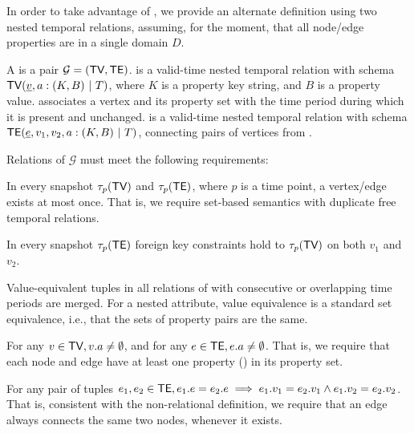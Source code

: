In order to take advantage of \tra, we provide an alternate definition
using two nested temporal relations, assuming, for the
  moment, that all node/edge properties are in a single domain $D$.

\begin{definition}
\label{def:tg2}
A \tg is a pair $\mathcal{G}=(\textsf{TV}, \textsf{TE})$. \tv is a valid-time nested
temporal relation with schema $\textsf{TV}(\underline{v}, a: (K,B) ~|~T)$,
where $K$ is a property key string, and $B$ is a property value.
  \tv
associates a vertex and its property set with the time period during
which it is present and unchanged. \te is a valid-time nested temporal
relation with schema $\textsf{TE}(\underline{e}, v_1, v_2, a:
(K,B) ~|~T)$, connecting pairs of vertices from \tv.

Relations of $\mathcal{G}$ must meet the following requirements:

\begin{description}[noitemsep,topsep=3pt,itemindent=\dimexpr\labelwidth+\labelsep\relax,leftmargin=0pt]
\item [R1: Unique vertices/ edges] In every snapshot $\tau_p (\textsf{TV})$
  and $\tau_p (\textsf{TE})$, where $p$ is a time point, a vertex/edge
  exists at most once.  That is, we require set-based semantics with
  duplicate free temporal relations.
\item [R2: Referential integrity] In every snapshot $\tau_p(\textsf{TE})$
  foreign key constraints hold to $\tau_p (\textsf{TV})$ on both $v_1$ and
  $v_2$.
\item [R3: Coalesced] Value-equivalent tuples in all relations of \tve
  with consecutive or overlapping time periods are merged.  For a
  nested attribute, value equivalence is a standard set equivalence,
  i.e., that the sets of property pairs are the same.
\item [R4: Required property] For any $v \in \textsf{TV},
  v.a\neq\emptyset$, and for any $e \in \textsf{TE}, e.a\neq\emptyset$.
  That is, we require that each node and edge have at least one
  property () in its property set.
\item [R5: Constant edge association] For any pair of tuples
  $e_1, e_2 \in \textsf{TE}, e_1.e = e_2.e \implies e_1.v_1 = e_2.v_1 \land
  e_1.v_2 = e_2.v_2$.  That is, consistent with the non-relational
  definition, we require that an edge always connects the same two
  nodes, whenever it exists.
\end{description}
\end{definition}

